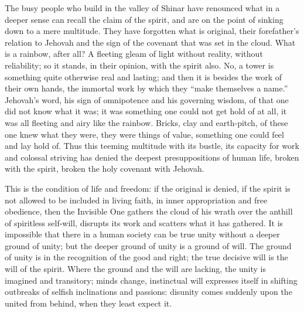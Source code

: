 \documentclass[12pt,a4paper,openany]{book}
\newcommand{\opage}[1]{\marginnote{\footnotesize\textit{[#1]}}}
\begin{document}
The busy people who build in the valley of Shinar have
renounced what in a deeper sense can
recall the claim of the spirit, and are on the point of
sinking down to a mere multitude. They have forgotten
what is original, their forefather's relation to Jehovah
and the sign of the covenant that was set in the cloud. What is
a rainbow, after all? A fleeting gleam of light without reality,
without reliability; so it stands, in
their opinion, with the spirit also. No, a tower is
something quite otherwise real and lasting; and then
it is besides the work of their own hands, the
immortal work by which they ``make themselves a name.'' Jehovah's
word, his sign of omnipotence and his governing wisdom,
of that one did not know what it was; it was something one
could not get hold of at all, it was all fleeting
and airy like the rainbow. Bricks, clay and
earth-pitch, of these one knew what they were, they were things of
value, something one could feel and lay hold of. Thus
this teeming multitude with its bustle, its
capacity for work and colossal striving has denied the deepest
presuppositions of human life, broken with the spirit,
broken the holy covenant with Jehovah.

This is the condition of life and freedom: if the original is denied,
if the spirit is not allowed to be included
\setcounter{footnote}{0}%
\opage{15}in living faith, in inner appropriation and free obedience, then
the Invisible One gathers the cloud of his wrath over the anthill
of spiritless self-will, disrupts its work and
scatters what it has gathered. It is impossible that there
in a human society can be true unity
without a deeper ground of unity; but the deeper
ground of unity is a ground of will. The ground of unity is in
the recognition of the good and right; the true decisive
will is the will of the spirit. Where the ground and the will are lacking,
the unity is imagined and transitory; minds
change, instinctual will expresses itself in shifting outbreaks of selfish
inclinations and passions: disunity comes
suddenly upon the united from behind, when they least expect it.
\end{document}
